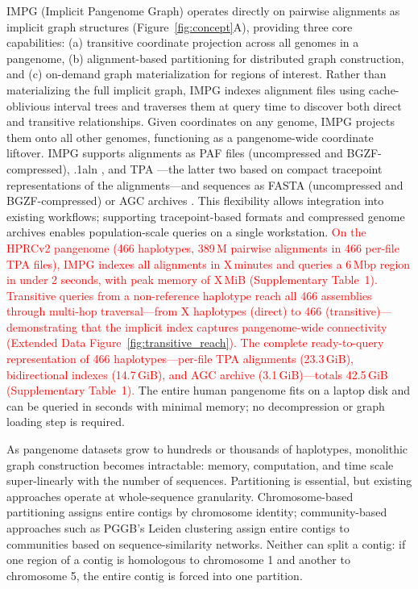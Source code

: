 
IMPG (Implicit Pangenome Graph) operates directly on pairwise alignments as implicit graph structures (Figure~\ref{fig:concept}A), providing three core capabilities: (a) transitive coordinate projection across all genomes in a pangenome, (b) alignment-based partitioning for distributed graph construction, and (c) on-demand graph materialization for regions of interest. Rather than materializing the full implicit graph, IMPG indexes alignment files using cache-oblivious interval trees \cite{dcjones2020} and traverses them at query time to discover both direct and transitive relationships. Given coordinates on any genome, IMPG projects them onto all other genomes, functioning as a pangenome-wide coordinate liftover. IMPG supports alignments as PAF files (uncompressed and BGZF-compressed), .1aln \cite{myers2025fastga}, and TPA \cite{tpa}---the latter two based on compact tracepoint representations of the alignments---and sequences as FASTA (uncompressed and BGZF-compressed) or AGC archives \cite{deorowicz2023agc}. This flexibility allows integration into existing workflows; supporting tracepoint-based formats and compressed genome archives enables population-scale queries on a single workstation. \textcolor{red}{On the HPRCv2 pangenome (466 haplotypes, 389\,M pairwise alignments in 466 per-file TPA files), IMPG indexes all alignments in X\,minutes and queries a 6\,Mbp region in under 2 seconds, with peak memory of X\,MiB (Supplementary Table~1). Transitive queries from a non-reference haplotype reach all 466 assemblies through multi-hop traversal---from X haplotypes (direct) to 466 (transitive)---demonstrating that the implicit index captures pangenome-wide connectivity (Extended Data Figure~\ref{fig:transitive_reach}). The complete ready-to-query representation of 466 haplotypes---per-file TPA alignments (23.3\,GiB), bidirectional indexes (14.7\,GiB), and AGC archive (3.1\,GiB)---totals 42.5\,GiB (Supplementary Table~1).} The entire human pangenome fits on a laptop disk and can be queried in seconds with minimal memory; no decompression or graph loading step is required.

As pangenome datasets grow to hundreds or thousands of haplotypes, monolithic graph construction becomes intractable: memory, computation, and time scale super-linearly with the number of sequences. Partitioning is essential, but existing approaches operate at whole-sequence granularity. Chromosome-based partitioning assigns entire contigs by chromosome identity; community-based approaches such as PGGB's Leiden clustering \cite{Garrison2024} assign entire contigs to communities based on sequence-similarity networks. Neither can split a contig: if one region of a contig is homologous to chromosome 1 and another to chromosome 5, the entire contig is forced into one partition.

